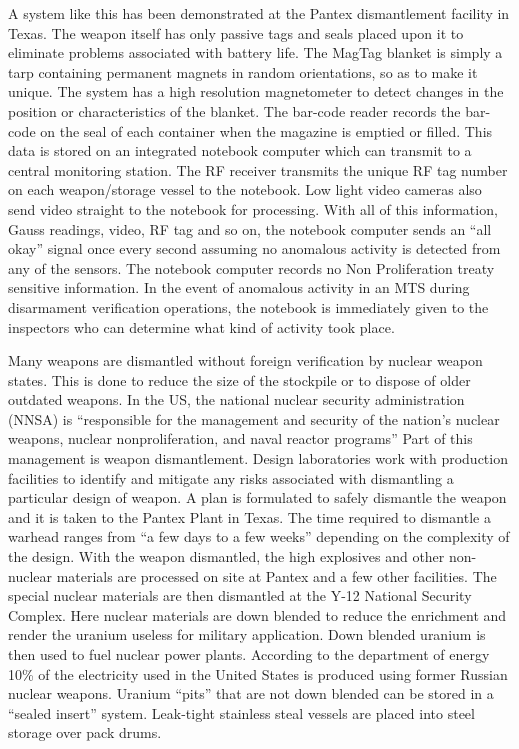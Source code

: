 \documentclass[twoside,titlepage,11pt,twocolumn,a4paper]{article}
\begin{document}
A system like this has been demonstrated at the Pantex dismantlement
facility in Texas. The weapon itself has only passive tags and seals
placed upon it to eliminate problems associated with battery life. The
MagTag blanket is simply a tarp containing permanent magnets in random
orientations, so as to make it unique. The system has a high
resolution magnetometer to detect changes in the position or
characteristics of the blanket. The bar-code reader records the
bar-code on the seal of each container when the magazine is emptied or
filled. This data is stored on an integrated notebook computer which
can transmit to a central monitoring station. The RF receiver
transmits the unique RF tag number on each weapon/storage vessel to
the notebook. Low light video cameras also send video straight to the
notebook for processing. With all of this information, Gauss readings,
video, RF tag and so on, the notebook computer sends an ``all okay''
signal once every second assuming no anomalous activity is detected
from any of the sensors. The notebook computer records no Non
Proliferation treaty sensitive information.  In the event of anomalous
activity in an MTS during disarmament verification operations, the
notebook is immediately given to the inspectors who can determine what
kind of activity took place. \citep{gerdes2001}

Many weapons are dismantled without foreign verification by nuclear
weapon states.  This is done to reduce the size of the stockpile or to
dispose of older outdated weapons.  In the US, the national nuclear
security administration (NNSA) is ``responsible for the management and
security of the nation's nuclear weapons, nuclear nonproliferation,
and naval reactor programs'' \citep{gerdes2001} Part of this
management is weapon dismantlement. Design laboratories work with
production facilities to identify and mitigate any risks associated
with dismantling a particular design of weapon. A plan is formulated
to safely dismantle the weapon and it is taken to the Pantex Plant in
Texas. The time required to dismantle a warhead ranges from ``a few
days to a few weeks'' depending on the complexity of the
design.\citep{ourMissionNNSA} With the weapon dismantled, the high
explosives and other non-nuclear materials are processed on site at
Pantex and a few other facilities.  The special nuclear materials are
then dismantled at the Y-12 National Security Complex.
\citep{pantex2010} Here nuclear materials are down blended to reduce
the enrichment and render the uranium useless for military
application. Down blended uranium is then used to fuel nuclear power
plants. According to the department of energy 10\% of the electricity
used in the United States is produced using former Russian nuclear
weapons. \citep{dismantlementNNSA} Uranium ``pits'' that are not down
blended can be stored in a ``sealed insert'' system. Leak-tight
stainless steal vessels are placed into steel storage over pack drums.
\end{document}
